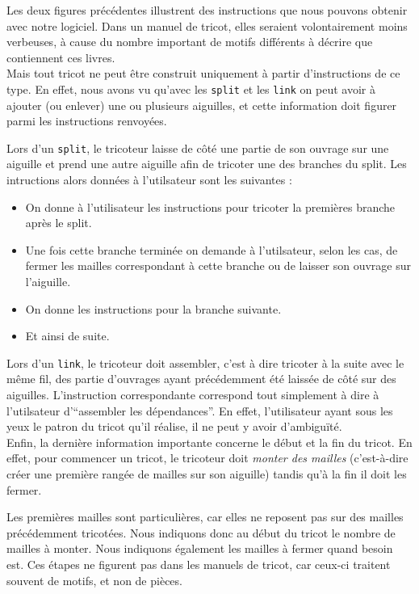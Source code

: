 \documentclass{article}
\begin{document}
Les deux figures précédentes illustrent des instructions que nous pouvons obtenir avec notre logiciel. 
Dans un manuel de tricot, elles seraient volontairement moins verbeuses, à cause du nombre important 
de motifs différents à décrire que contiennent ces livres. \\

Mais tout tricot ne peut être construit uniquement à partir d'instructions de ce type. En effet, nous 
avons vu qu'avec les \texttt{split} et les \texttt{link} on peut avoir à ajouter (ou enlever) 
une ou plusieurs aiguilles, et cette information doit figurer parmi les instructions renvoyées.

Lors d'un \texttt{split}, le tricoteur laisse de côté une partie de son ouvrage sur une aiguille et prend une autre aiguille afin de tricoter une des branches du split. Les intructions alors données à l'utilsateur sont les suivantes :
\begin{itemize}
 \item On donne à l'utilisateur les instructions pour tricoter la premières branche après le split.
 \item Une fois cette branche terminée on demande à l'utilsateur, selon les cas, de fermer les mailles correspondant à cette branche ou de laisser son ouvrage sur l'aiguille.
 \item On donne les instructions pour la branche suivante.
 \item Et ainsi de suite.
\end{itemize}

Lors d'un \texttt{link}, le tricoteur doit assembler, c'est à dire tricoter à la suite avec le même fil, des partie d'ouvrages ayant précédemment été laissée de côté sur des aiguilles. L'instruction correspondante correspond tout simplement à dire à l'utilsateur d'``assembler les dépendances''. En effet, l'utilisateur ayant sous les yeux le patron du tricot qu'il réalise, il ne peut y avoir d'ambiguïté. \\


Enfin, la dernière information importante concerne le début et la fin du tricot. En effet, pour commencer un tricot, 
le tricoteur doit \emph{monter des mailles} (c'est-à-dire créer une première rangée de mailles sur son 
aiguille) tandis qu'à la fin il doit les fermer. 

Les premières mailles sont particulières, car elles ne 
reposent pas sur des mailles précédemment tricotées. Nous indiquons donc au début du tricot le nombre de 
mailles à monter.
Nous indiquons également les mailles à fermer quand besoin est.
Ces étapes ne figurent pas dans les manuels de tricot, car ceux-ci traitent souvent de 
motifs, et non de pièces. \\
\end{document}
